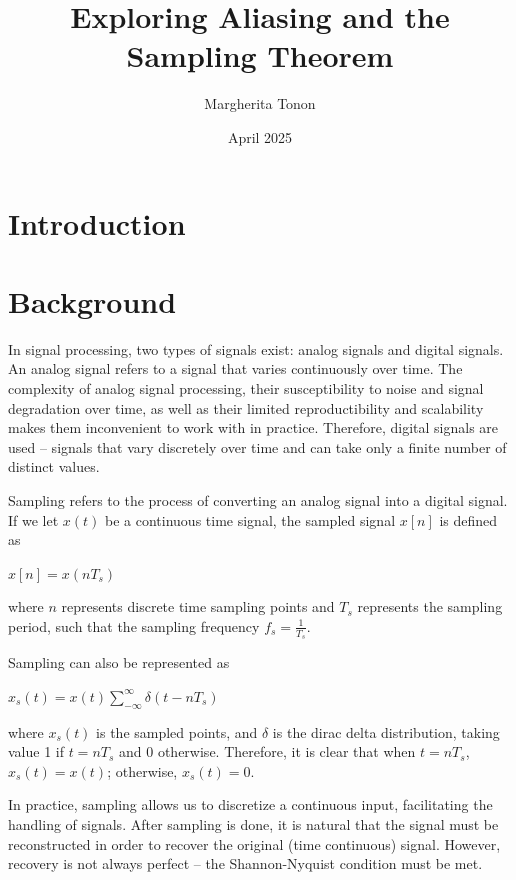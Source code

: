 \documentclass{article}
\title{Exploring Aliasing and the Sampling Theorem} %
\author{Margherita Tonon}
\date{April 2025}
\begin{document}
\maketitle

\section{Introduction}

\section{Background}
In signal processing, two types of signals exist: analog signals and digital signals. %
An analog signal refers to a signal that varies continuously over time. 
The complexity of analog signal processing, their susceptibility to noise and signal degradation over time, as well as their limited reproductibility and scalability makes them inconvenient to work with in practice. 
Therefore, digital signals are used -- signals that vary discretely over time and can take only a finite number of distinct values.

Sampling refers to the process of converting an analog signal into a digital signal. If we let $x(t)$ be a continuous time signal, the sampled signal $x[n]$ is defined as
\begin{center}
    \begin{math}
        x[n] = x(nT_s)
    \end{math}  
\end{center}
where $n$ represents discrete time sampling points and $T_s$ represents the sampling period, such that the sampling frequency $f_s = \frac{1}{T_s}$.

Sampling can also be represented as 
\begin{center}
    \begin{math}
        x_s(t) = x(t) \sum_{-\infty}^{\infty} \delta (t-nT_s)
    \end{math}  
\end{center}
where $x_s(t)$ is the sampled points, and $\delta$ is the dirac delta distribution, taking value 1 if $t=nT_s$ and 0 otherwise.
Therefore, it is clear that when $t=nT_s$, $x_s(t) = x(t)$; otherwise, $x_s(t) = 0$. 

In practice, sampling allows us to discretize a continuous input, facilitating the handling of signals. After sampling is done, it is natural that the signal must be reconstructed in order to recover the original (time continuous) signal.
However, recovery is not always perfect -- the Shannon-Nyquist condition must be met.
\end{document}
